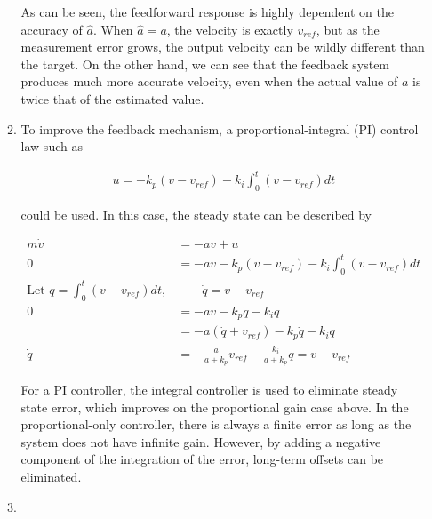 \documentclass[11pt]{article}
\theoremstyle{definition}
\begin{document}
\begin{enumerate}
\begin{enumerate}
        As can be seen, the feedforward response is highly dependent on the accuracy of $\hat{a}$.  When $\hat{a} = a$, the velocity is exactly $v_{ref}$, but as the measurement error grows, the output velocity can be wildly different than the target.  On the other hand, we can see that the feedback system produces much more accurate velocity, even when the actual value of $a$ is twice that of the estimated value.
        
        \item %
        To improve the feedback mechanism, a proportional-integral (PI) control law such as 

        \begin{align*}
            u = -k_p (v - v_{ref}) - k_i \int_0^t (v - v_{ref})dt
        \end{align*}

         could be used.  In this case, the steady state can be described by

        \begin{align*}
            m\dot{v} &= -av + u\\
            0 &= -av  - k_p (v - v_{ref}) - k_i \int_0^t (v - v_{ref})dt \\
            \text{Let } q=  \int_0^t (v - v_{ref})dt, &\qquad \dot{q} = v - v_{ref} \\
            0 &= -av -k_p \dot{q} - k_i q \\
            &= - a \left(\dot{q}+ v_{ref} \right) - k_p \dot{q} - k_i q \\
            \dot{q} &= -\frac{a}{a + k_p} v_{ref} - \frac{k_i}{a + k_p} q = v - v_{ref}
         \end{align*}

         For a PI controller, the integral controller is used to eliminate steady state error, which improves on the proportional gain case above.  In the proportional-only controller, there is always a finite error as long as the system does not have infinite gain.  However, by adding a negative component of the integration of the error, long-term offsets can be eliminated.

        \item %
        
        
    \end{enumerate}

\end{enumerate}
\end{document}
